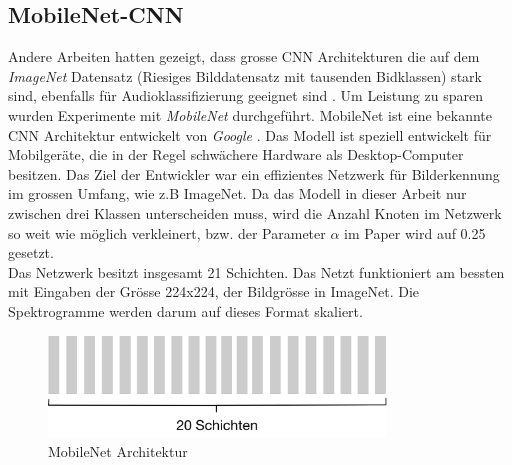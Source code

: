 \subsection{MobileNet-CNN}
Andere Arbeiten hatten gezeigt, dass grosse CNN Architekturen die auf dem \textit{ImageNet}\parencite{imagenet} Datensatz (Riesiges Bilddatensatz mit tausenden Bidklassen) stark sind, ebenfalls für Audioklassifizierung geeignet sind \parencite{cnn_large}. Um Leistung zu sparen wurden Experimente mit \textit{MobileNet} durchgeführt.
MobileNet ist eine bekannte CNN Architektur entwickelt von \textit{Google} \parencite[][(V2)]{mobilenet}. Das Modell ist speziell entwickelt für Mobilgeräte, die in der Regel schwächere Hardware als Desktop-Computer besitzen. Das Ziel der Entwickler war ein effizientes Netzwerk für Bilderkennung im grossen Umfang, wie z.B ImageNet. Da das Modell in dieser Arbeit nur zwischen drei Klassen unterscheiden muss, wird die Anzahl Knoten im Netzwerk so weit wie möglich verkleinert, bzw. der Parameter $\alpha$ im Paper wird auf 0.25 gesetzt. 
\\
Das Netzwerk besitzt insgesamt 21 Schichten. Das Netzt funktioniert am bessten mit Eingaben der Grösse 224x224, der Bildgrösse in ImageNet. Die Spektrogramme werden darum auf dieses Format skaliert.
 \begin{figure}[hbt]
	\centering
		\includegraphics[width=0.8\textwidth]{assets/mobilenet.png}
	\caption{MobileNet Architektur \parencite[][(V2)]{mobilenet}}
	\label{img:mobilenet}
\end{figure}

